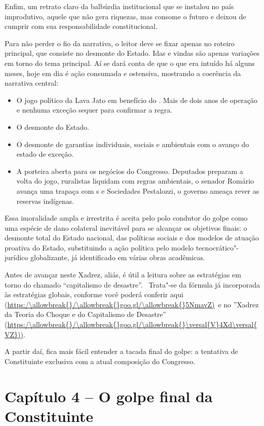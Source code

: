 Enfim, um retrato claro da balbúrdia institucional que se instalou no
país improdutivo, aquele que não gera riquezas, mas consome o futuro e
deixou de cumprir com sua responsabilidade constitucional.

Para não perder o fio da narrativa, o leitor deve se fixar apenas no
roteiro principal, que consiste no desmonte do Estado. Idas e vindas são
apenas variações em torno do tema principal. Aí se dará conta de que o
que era intuído há alguns meses, hoje em dia é ação consumada e
ostensiva, mostrando a coerência da narrativa central:

\begin{itemize}
\itemsep1pt\parskip0pt
\item
  O jogo político da Lava Jato em benefício do . Mais de dois anos
  de operação e nenhuma exceção sequer para confirmar a regra.
\item
  O desmonte do Estado.
\item
  O desmonte de garantias individuais, sociais e ambientais com o avanço
  do estado de exceção.
\item
  A porteira aberta para os negócios do Congresso. Deputados preparam a
  volta do jogo, ruralistas liquidam com regras ambientais, o senador
  Romário avança uma trapaça com s e Sociedades Pestalozzi, o
  governo ameaça rever as reservas indígenas.
\end{itemize}

Essa imoralidade ampla e irrestrita é aceita pelo polo condutor do golpe
como uma espécie de dano colateral inevitável para se alcançar os
objetivos finais: o desmonte total do Estado nacional, das políticas
sociais e dos modelos de atuação proativa do Estado, substituindo a ação
política pelo modelo tecnocrático"-jurídico globalizante, já identificado
em várias obras acadêmicas.

Antes de avançar neste Xadrez, aliás, é útil a leitura sobre as
estratégias em torno do chamado ``capitalismo de desastre''.~ Trata"-se
da fórmula já incorporada às estratégias globais, conforme você poderá
conferir aqui (\url{https:/\allowbreak{}/\allowbreak{}goo.gl/\allowbreak{}5NmavZ)}~e no ''Xadrez da Teoria do
Choque e do Capitalismo de Desastre'' (\url{https:/\allowbreak{}/\allowbreak{}goo.gl/\allowbreak{}\versal{V}4Xd\versal{VZ}))}.

A partir daí, fica mais fácil entender a tacada final do golpe: a
tentativa de Constituinte exclusiva com a atual composição do Congresso.

\section{Capítulo 4 -- O golpe final da Constituinte}

